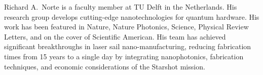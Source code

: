 \documentclass[a4paper,parskip,10pt]{scrartcl}
\begin{document}
\begin{tcolorbox}
        {
            \small
            \color{white!20!black}
            Richard A.\ Norte is a faculty member at TU Delft in the Netherlands. His research group develops cutting-edge nanotechnologies for quantum hardware. His work has been featured in Nature, Nature Photonics, Science, Physical Review Letters, and on the cover of Scientific American. His team has achieved significant breakthroughs in laser sail nano-manufacturing, reducing fabrication times from 15 years to a single day by integrating nanophotonics, fabrication techniques, and economic considerations of the Starshot mission.}

        

        \vspace{2ex}
    \end{tcolorbox}
    \vspace{-1ex}

    \vfill
\end{document}
